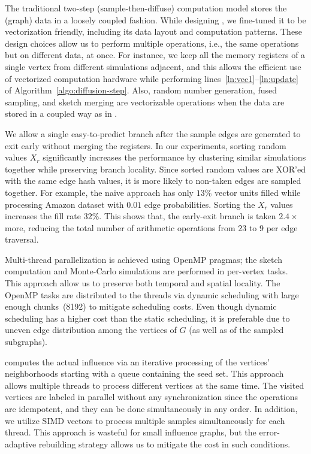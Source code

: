The traditional two-step (sample-then-diffuse) computation model stores the (graph) data in a loosely coupled fashion.
While designing \acro, we fine-tuned it to be vectorization friendly, including its data layout and computation patterns. These design choices allow us to perform multiple operations, i.e., the same operations but on different data, at once. For instance, we keep all the memory registers of a single vertex from different simulations adjacent, and this allows the efficient use of vectorized computation hardware while performing lines~\ref{ln:vec1}--\ref{ln:update} of Algorithm~\ref{algo:diffusion-step}. Also, random number generation, fused sampling, and sketch merging are vectorizable operations when the data are stored in a coupled way as in \acro.

We allow a single easy-to-predict branch after the sample edges are generated to exit early without merging the registers. In our experiments, sorting random values $X_r$ significantly increases the performance by clustering similar simulations together while preserving branch locality. Since sorted random values are XOR'ed with the same edge hash values, it is more likely to non-taken edges are sampled together. For example, the naive approach has only $13\%$ vector units filled while processing Amazon dataset with $0.01$ edge probabilities. Sorting the $X_r$ values increases the fill rate  $32\%$. This shows that, the early-exit branch is taken $2.4\times$ more, reducing the total number of arithmetic operations from $23$ to $9$ per edge traversal.

Multi-thread parallelization is achieved using OpenMP pragmas; the sketch computation and Monte-Carlo simulations are performed in per-vertex tasks. This approach allow us to preserve both temporal and spatial locality. The OpenMP tasks are distributed to the threads via dynamic scheduling with large enough chunks~(8192) to mitigate scheduling costs. Even though dynamic scheduling has a higher cost than the static scheduling, it is preferable due to uneven edge distribution among the vertices of $G$ (as well as of the sampled subgraphs).  

\acro computes the actual influence via an iterative processing of the vertices' neighborhoods starting with a queue containing the seed set. This approach allows multiple threads to process different vertices at the same time. The visited vertices are labeled in parallel without any synchronization since the operations are idempotent, and they can be done simultaneously in any order. In addition, we utilize SIMD vectors to process multiple samples simultaneously for each thread. This approach is wasteful for small influence graphs, but the error-adaptive rebuilding strategy allows us to mitigate the cost in such conditions.   

